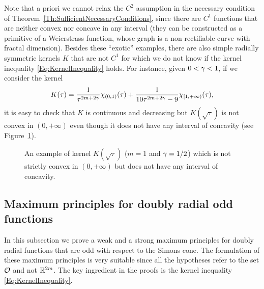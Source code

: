 \begin{remark}
	Note that a priori we cannot relax the $C^2$ assumption in the necessary condition of Theorem~\ref{Th:SufficientNecessaryConditions}, since there are $C^1$ functions that are neither convex nor concave in any interval (they can be constructed as a primitive of a Weierstrass function, whose graph is a non rectifiable curve with fractal dimension). Besides these ``exotic'' examples, there are also simple radially symmetric kernels $K$ that are not $C^1$ for which we do not know if the kernel inequality \eqref{Eq:KernelInequality} holds. For instance, given $0<\gamma<1$, if we consider the kernel
	$$ K(\tau) = \frac{1}{\tau^{2m+2\gamma}} \chi_{(0,1)}(\tau)+\frac{1}{10\tau^{2m+2\gamma}-9} \chi_{[1,+\infty)}(\tau), $$
	it is easy to check that $K$ is continuous and decreasing but $K(\sqrt{\tau})$ is not convex in $(0,+\infty)$ even though it does not have any interval of concavity (see Figure~\ref{Fig:Grafica}).
	\begin{figure}
	\centering
	\caption{An example of kernel $K(\sqrt{\tau})$ ($m=1$ and $\gamma=1/2$) which is not strictly convex in $(0,+\infty)$ but does not have any interval of concavity. }
	\label{Fig:Grafica}
	\end{figure}
\end{remark}

\subsection{Maximum principles for doubly radial odd functions}

In this subsection we prove a weak and a strong maximum principles for doubly radial functions that are odd with respect to the Simons cone. The formulation of these maximum principles is very suitable since all the hypotheses refer to the set $\mathcal{O}$ and not $\mathbb{R}^{2m}$. The key ingredient in the proofs is the kernel inequality \eqref{Eq:KernelInequality}.


